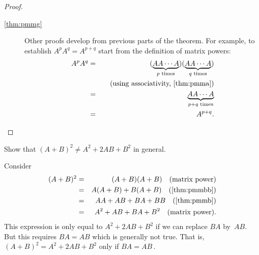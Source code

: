 \begin{proof}
\begin{description}
\item[\ref{thm:pmmg}]
Other proofs develop from previous parts of the theorem.
For example, to establish \(A^pA^q=A^{p+q}\) start from the definition of matrix powers:
\begin{eqnarray*}
A^pA^q&=&(\underbrace{AA\cdots A}_{p\text{ times}})
(\underbrace{AA\cdots A}_{q\text{ times}})
\\&&\quad(\text{using associativity, \autoref{thm:pmma}})
\\&=&\underbrace{AA\cdots A}_{p+q\text{ times}}
\\&=&A^{p+q}.
\end{eqnarray*}

\end{description}
\end{proof}



\begin{example} 
Show that \((A+B)^2\neq A^2+2AB+B^2\)  in general.
\begin{solution} 
Consider
\begin{eqnarray*}
(A+B)^2&=& (A+B)(A+B) \quad(\text{matrix power})
\\&=&A(A+B)+B(A+B) \quad(\text{\autoref{thm:pmmbb}})
\\&=&AA+AB+BA+BB \quad(\text{\autoref{thm:pmmb}})
\\&=&A^2+AB+BA+B^2 \quad(\text{matrix power}).
\end{eqnarray*}
This expression is only equal to \(A^2+2AB+B^2\) if we can replace \(BA\) by~\(AB\).  
But this requires \(BA=AB\) which is generally not true.
That is, \((A+B)^2= A^2+2AB+B^2\) only if \(BA=AB\)\,.
\end{solution}
\end{example}




